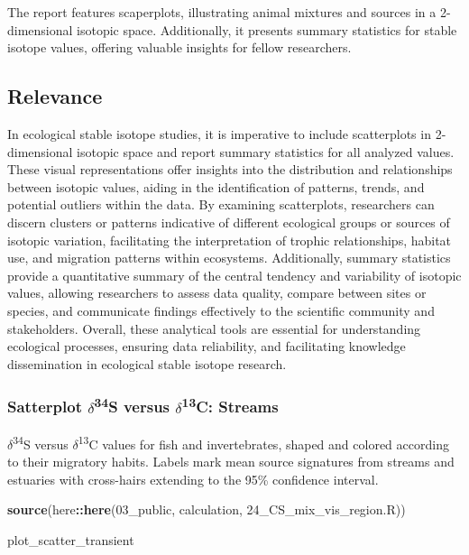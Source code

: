 \documentclass[
]{article}
\newenvironment{Shaded}{\begin{snugshade}}{\end{snugshade}}
\newcommand{\FunctionTok}[1]{\textcolor[rgb]{0.13,0.29,0.53}{\textbf{#1}}}
\newcommand{\NormalTok}[1]{#1}
\newcommand{\SpecialCharTok}[1]{\textcolor[rgb]{0.81,0.36,0.00}{\textbf{#1}}}
\newcommand{\StringTok}[1]{\textcolor[rgb]{0.31,0.60,0.02}{#1}}
\begin{document}
The report features scaperplots, illustrating animal mixtures and
sources in a 2-dimensional isotopic space. Additionally, it presents
summary statistics for stable isotope values, offering valuable insights
for fellow researchers.

\hypertarget{relevance}{%
\subsection{Relevance}\label{relevance}}

In ecological stable isotope studies, it is imperative to include
scatterplots in 2-dimensional isotopic space and report summary
statistics for all analyzed values. These visual representations offer
insights into the distribution and relationships between isotopic
values, aiding in the identification of patterns, trends, and potential
outliers within the data. By examining scatterplots, researchers can
discern clusters or patterns indicative of different ecological groups
or sources of isotopic variation, facilitating the interpretation of
trophic relationships, habitat use, and migration patterns within
ecosystems. Additionally, summary statistics provide a quantitative
summary of the central tendency and variability of isotopic values,
allowing researchers to assess data quality, compare between sites or
species, and communicate findings effectively to the scientific
community and stakeholders. Overall, these analytical tools are
essential for understanding ecological processes, ensuring data
reliability, and facilitating knowledge dissemination in ecological
stable isotope research.

\newpage

\hypertarget{satterplot-delta34s-versus-delta13c-streams}{%
\subsubsection{\texorpdfstring{Satterplot
\(\delta\)\textsuperscript{34}S versus \(\delta\)\textsuperscript{13}C:
Streams}{Satterplot \textbackslash delta34S versus \textbackslash delta13C: Streams}}\label{satterplot-delta34s-versus-delta13c-streams}}

\(\delta\)\textsuperscript{34}S versus \(\delta\)\textsuperscript{13}C
values for fish and invertebrates, shaped and colored according to their
migratory habits. Labels mark mean source signatures from streams and
estuaries with cross-hairs extending to the 95\% confidence interval.

\begin{Shaded}
\begin{Highlighting}[]
\FunctionTok{source}\NormalTok{(here}\SpecialCharTok{::}\FunctionTok{here}\NormalTok{(}\StringTok{\textquotesingle{}03\_public\textquotesingle{}}\NormalTok{, }\StringTok{\textquotesingle{}calculation\textquotesingle{}}\NormalTok{, }\StringTok{\textquotesingle{}24\_CS\_mix\_vis\_region.R\textquotesingle{}}\NormalTok{))}

\NormalTok{plot\_scatter\_transient}
\end{Highlighting}
\end{Shaded}
\end{document}
